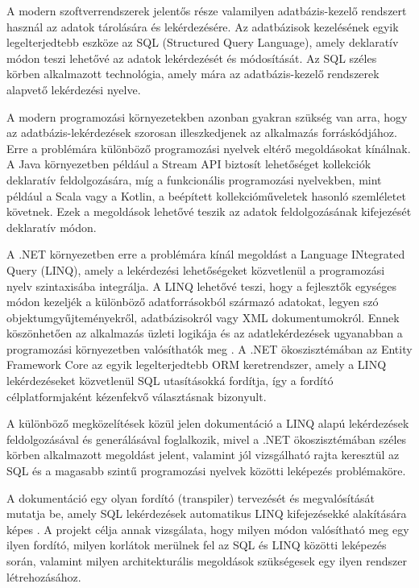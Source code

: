 
A modern szoftverrendszerek jelentős része valamilyen adatbázis-kezelő rendszert használ az adatok tárolására és lekérdezésére. Az adatbázisok kezelésének egyik legelterjedtebb eszköze az SQL (Structured Query Language), amely deklaratív módon teszi lehetővé az adatok lekérdezését és módosítását. Az SQL széles körben alkalmazott technológia, amely mára az adatbázis-kezelő rendszerek alapvető lekérdezési nyelve.

A modern programozási környezetekben azonban gyakran szükség van arra, hogy az adat\-bá\-zis-lekérdezések szorosan illeszkedjenek az alkalmazás forráskódjához. Erre a problémára különböző programozási nyelvek eltérő megoldásokat kínálnak. A Java környezetben például a Stream API biztosít lehetőséget kollekciók deklaratív feldolgozására, míg a funkcionális programozási nyelvekben, mint például a Scala vagy a Kotlin, a beépített kollekcióműveletek hasonló szemléletet követnek. Ezek a megoldások lehetővé teszik az adatok feldolgozásának kifejezését deklaratív módon.

A .NET környezetben erre a problémára kínál megoldást a Language INtegrated Query (LINQ), amely a lekérdezési lehetőségeket közvetlenül a programozási nyelv szintaxisába integrálja. A LINQ lehetővé teszi, hogy a fejlesztők egységes módon kezeljék a különböző adatforrásokból származó adatokat, legyen szó objektumgyűjteményekről, adatbázisokról vagy XML dokumentumokról. Ennek köszönhetően az alkalmazás üzleti logikája és az adatlekérdezések ugyanabban a programozási környezetben valósíthatók meg \cite{skeet2019csharp,freeman2010prolinq}. A .NET ökoszisztémában az Entity Framework Core az egyik legelterjedtebb ORM keretrendszer, amely a LINQ lekérdezéseket közvetlenül SQL utasításokká fordítja, így a fordító célplatformjaként kézenfekvő választásnak bizonyult.

A különböző megközelítések közül jelen dokumentáció a LINQ alapú lekérdezések feldolgozásával és generálásával foglalkozik, mivel a .NET ökoszisztémában széles körben alkalmazott megoldást jelent, valamint jól vizsgálható rajta keresztül az SQL és a magasabb szintű programozási nyelvek közötti leképezés problémaköre.

A dokumentáció egy olyan fordító (transpiler) tervezését és megvalósítását mutatja be, a\-mely SQL lekérdezések automatikus LINQ kifejezésekké alakítására képes \cite{nmorph2023}. A projekt célja annak vizsgálata, hogy milyen módon valósítható meg egy ilyen fordító, milyen korlátok merülnek fel az SQL és LINQ közötti leképezés során, valamint milyen architekturális megoldások szükségesek egy ilyen rendszer létrehozásához.


